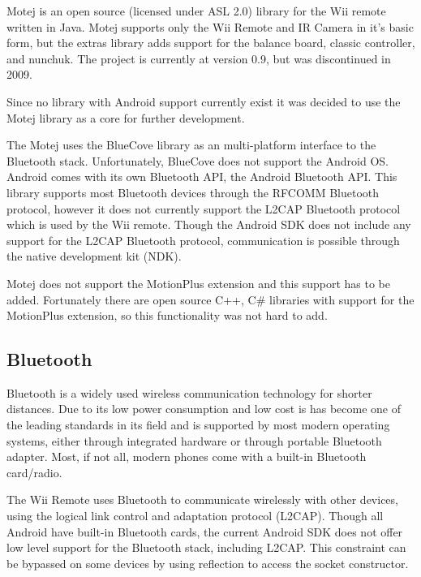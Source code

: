 \documentclass[11pt,twoside,a4paper]{report}
\begin{document}
Motej is an open source (licensed under ASL 2.0) library for the Wii remote written in Java. Motej supports only the Wii Remote and IR Camera in it's basic form, but the extras library adds support for the balance board, classic controller, and nunchuk. The project is currently at version 0.9, but was discontinued in 2009. %

Since no library with Android support currently exist it was decided to use the Motej library as a core for further development.

The Motej uses the BlueCove library as an multi-platform interface to the Bluetooth stack. Unfortunately, BlueCove does not support the Android OS. Android comes with its own Bluetooth API, the Android Bluetooth API. This library supports most Bluetooth devices through the RFCOMM Bluetooth protocol, however it does not currently support the L2CAP Bluetooth protocol which is used by the Wii remote. Though the Android SDK does not include any support for the L2CAP Bluetooth protocol, communication is possible through the native development kit (NDK). %

Motej does not support the MotionPlus extension and this support has to be added. Fortunately there are open source C++, C\# libraries with support for the MotionPlus extension, so this functionality was not hard to add.


\subsection{Bluetooth}
Bluetooth is a widely used wireless communication technology for shorter distances. Due to its low power consumption and low cost is has become one of the leading standards in its field and is supported by most modern operating systems, either through integrated hardware or through portable Bluetooth adapter. Most, if not all, modern phones come with a built-in Bluetooth card/radio. %

The Wii Remote uses Bluetooth to communicate wirelessly with other devices, using the logical link control and adaptation protocol (L2CAP). Though all Android have built-in Bluetooth cards, the current Android SDK does not offer low level support for the Bluetooth stack, including L2CAP. This constraint can be bypassed on some devices by using reflection to access the socket constructor. %



\end{document}
